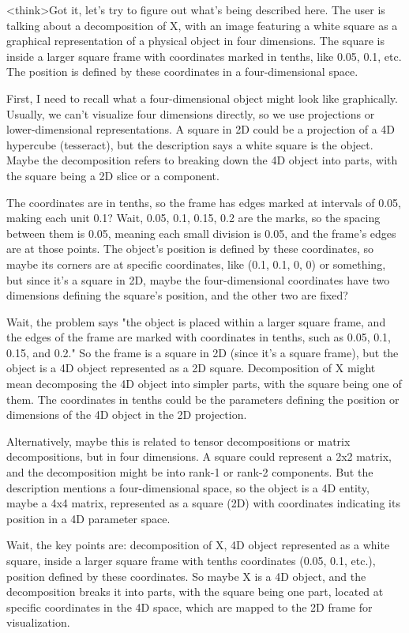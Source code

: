 <think>Got it, let's try to figure out what's being described here. The user is talking about a decomposition of X, with an image featuring a white square as a graphical representation of a physical object in four dimensions. The square is inside a larger square frame with coordinates marked in tenths, like 0.05, 0.1, etc. The position is defined by these coordinates in a four-dimensional space.

First, I need to recall what a four-dimensional object might look like graphically. Usually, we can't visualize four dimensions directly, so we use projections or lower-dimensional representations. A square in 2D could be a projection of a 4D hypercube (tesseract), but the description says a white square is the object. Maybe the decomposition refers to breaking down the 4D object into parts, with the square being a 2D slice or a component.

The coordinates are in tenths, so the frame has edges marked at intervals of 0.05, making each unit 0.1? Wait, 0.05, 0.1, 0.15, 0.2 are the marks, so the spacing between them is 0.05, meaning each small division is 0.05, and the frame's edges are at those points. The object's position is defined by these coordinates, so maybe its corners are at specific coordinates, like (0.1, 0.1, 0, 0) or something, but since it's a square in 2D, maybe the four-dimensional coordinates have two dimensions defining the square's position, and the other two are fixed?

Wait, the problem says "the object is placed within a larger square frame, and the edges of the frame are marked with coordinates in tenths, such as 0.05, 0.1, 0.15, and 0.2." So the frame is a square in 2D (since it's a square frame), but the object is a 4D object represented as a 2D square. Decomposition of X might mean decomposing the 4D object into simpler parts, with the square being one of them. The coordinates in tenths could be the parameters defining the position or dimensions of the 4D object in the 2D projection.

Alternatively, maybe this is related to tensor decompositions or matrix decompositions, but in four dimensions. A square could represent a 2x2 matrix, and the decomposition might be into rank-1 or rank-2 components. But the description mentions a four-dimensional space, so the object is a 4D entity, maybe a 4x4 matrix, represented as a square (2D) with coordinates indicating its position in a 4D parameter space.

Wait, the key points are: decomposition of X, 4D object represented as a white square, inside a larger square frame with tenths coordinates (0.05, 0.1, etc.), position defined by these coordinates. So maybe X is a 4D object, and the decomposition breaks it into parts, with the square being one part, located at specific coordinates in the 4D space, which are mapped to the 2D frame for visualization.

